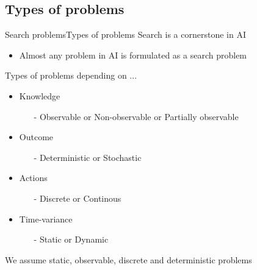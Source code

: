 \documentclass[10pt,compress]{beamer} %
\begin{document}
\subsection{Types of problems}
\begin{frame}{Search problems}{Types of problems}
    Search is a cornerstone in AI
    \begin{itemize}
        \item Almost any problem in AI is formulated as a search problem
    \end{itemize}

    Types of problems depending on ...
	\begin{itemize}
        \item Knowledge
            \begin{itemize}
                \item[-] Observable or Non-observable or Partially observable
            \end{itemize}
        \item Outcome
            \begin{itemize}
                \item[-] Deterministic or Stochastic
            \end{itemize}
        \item Actions
            \begin{itemize}
                \item[-] Discrete or Continous
            \end{itemize}
        \item Time-variance
            \begin{itemize}
                \item[-] Static or Dynamic
            \end{itemize}
	\end{itemize}
    We assume static, observable, discrete and deterministic problems
\end{frame}
\end{document}
